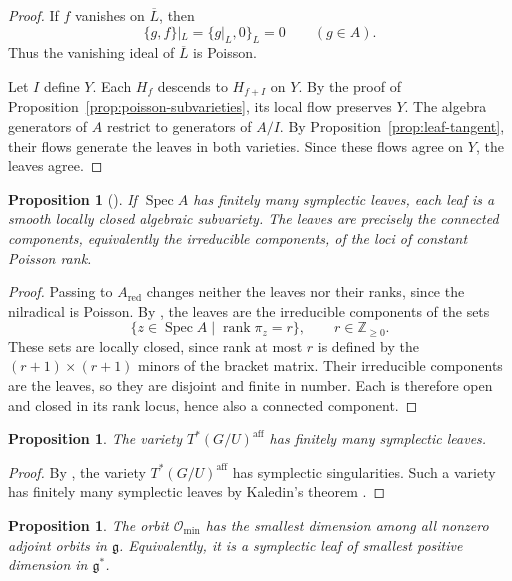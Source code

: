 \documentclass[12pt]{article}
\theoremstyle{paperplain}
\newtheorem{proposition}[theorem]{Proposition}
\theoremstyle{paperdefinition}
\DeclareMathOperator{\Spec}{Spec}
\newcommand{\Omin}{\mathcal O_{\min}}
\newcommand{\g}{\mathfrak g}
\begin{document}
\begin{proof}
    If $f$ vanishes on $\overline L$, then
    $$
        \{g,f\}|_L=\{g|_L,0\}_L=0\qquad(g\in A).
    $$
    Thus the vanishing ideal of $\overline L$ is Poisson.

    Let $I$ define $Y$. Each $H_f$ descends to $H_{f+I}$ on $Y$. By the proof of Proposition~\ref{prop:poisson-subvarieties}, its local flow preserves $Y$. The algebra generators of $A$ restrict to generators of $A/I$. By Proposition~\ref{prop:leaf-tangent}, their flows generate the leaves in both varieties. Since these flows agree on $Y$, the leaves agree.
\end{proof}

\begin{proposition}[{\cite[Proposition~3.7]{BrownGordon}}]\label{prop:finite-leaves}
    If $\Spec A$ has finitely many symplectic leaves, each leaf is a smooth locally closed algebraic subvariety. The leaves are precisely the connected components, equivalently the irreducible components, of the loci of constant Poisson rank.
\end{proposition}

\begin{proof}
    Passing to $A_{\mathrm{red}}$ changes neither the leaves nor their ranks, since the nilradical is Poisson. By \cite[Proposition~3.7(1), (2)(a),(c)]{BrownGordon}, the leaves are the irreducible components of the sets
    $$
        \{z\in\Spec A\mid\operatorname{rank}\pi_z=r\},
        \qquad r\in\mathbb Z_{\ge0}.
    $$
    These sets are locally closed, since rank at most $r$ is defined by the $(r+1)\times(r+1)$ minors of the bracket matrix. Their irreducible components are the leaves, so they are disjoint and finite in number. Each is therefore open and closed in its rank locus, hence also a connected component.
\end{proof}

\begin{proposition}\label{prop:implosion-finiteness}
    The variety $T^*(G/U)^{\mathrm{aff}}$ has finitely many symplectic leaves.
\end{proposition}

\begin{proof}
    By \cite[Theorem~1.1]{Gannon}, the variety $T^*(G/U)^{\mathrm{aff}}$ has symplectic singularities. Such a variety has finitely many symplectic leaves by Kaledin's theorem \cite[Theorem~2.3]{Kaledin}.
\end{proof}

\begin{proposition}\label{prop:minimal-adjoint-dimension}
    The orbit $\Omin$ has the smallest dimension among all nonzero adjoint orbits in $\g$. Equivalently, it is a symplectic leaf of smallest positive dimension in $\g^*$.
\end{proposition}
\end{document}
